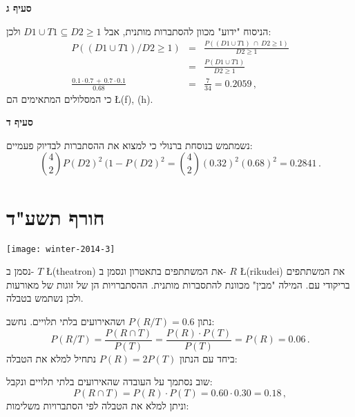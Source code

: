 \textbf{סעיף ג}

הניסוח "ידוע" מכוון להסתברות מותנית, אבל
$D1\cup T1\subseteq D2\geq 1$
ולכן:
\begin{eqnarray*}
P((D1\cup T1)/D2\geq 1)&=&\frac{P((D1\cup T1) \:\cap\: D2\geq 1)}
  {D2\geq 1}\\
  &=&\frac{P(D1\cup T1)}{D2\geq 1}\\
\frac{0.1\cdot 0.7 \,+\, 0.7\cdot 0.1}{0.68} &=& \frac{7}{34}= 0.2059\,,  
\end{eqnarray*}
כי המסלולים המתאימים הם 
\L{(f), (h)}.

\textbf{סעיף ד}

נשמתמש בנוסחת ברנולי כי למצוא את ההסתברות לבדיוק פעמיים:
\[
{4\choose 2}P(D2)^2\: (1-P(D2)^2 =
{4\choose 2} (0.32)^2 (0.68)^2= 0.2841\,.
\]


\section{חורף תשע"ד}

\begin{center}
\texttt{[image: winter-2014-3]}
\end{center}

נסמן ב-%
$T$ \L{(theatron)}
את המשתתפים בתאטרון ונסמן ב-%
$R$ \L{(rikudei)}
את המשתתפים בריקודי עם. המילה "מבין" מכוונת להתסברות מותנית. ההסתברויות הן של זוגות של מאורעות ולכן נשתמש בטבלה.


נתון
$P(R/T)=0.6$
ושהאירועים בלתי תלויים. נחשב:
\[
P(R/T)=\frac{P(R\cap T)}{P(T)}=\frac{P(R)\cdot P(T)}{P(T)}=P(R)=0.06\,.
\]
ביחד עם הנתון
$P(R)=2P(T)$
נתחיל למלא את הטבלה:
\begin{center}
\end{center}
שוב נסתמך על העובדה שהאירועים בלתי תלויים ונקבל:
\[
P(R\cap T)=P(R)\cdot P(T)=0.60\cdot 0.30=0.18\,,
\]
וניתן למלא את הטבלה לפי הסתברויות משלימות:
\begin{center}
\end{center}

